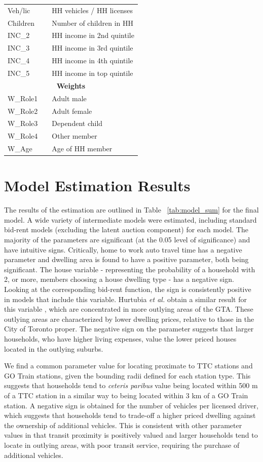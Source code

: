 \begin{longtable}{l r l}
Veh/lic & & HH vehicles / HH licenses  \\
Children & & Number of children in HH  \\
INC\_2 & & HH income in 2nd quintile \\
INC\_3 & & HH income in 3rd quintile \\
INC\_4 & & HH income in 4th quintile \\
INC\_5 & & HH income in top quintile \\
\multicolumn{3}{c}{\textbf{Weights}} \\
W\_Role1 & & Adult male \\
W\_Role2 & & Adult female \\
W\_Role3 & & Dependent child \\
W\_Role4 & & Other member \\
W\_Age & & Age of HH member \\
\bottomrule
\end{longtable}

\section{Model Estimation Results}
The results of the estimation are outlined in Table ~\ref{tab:model_sum} for the final model. A wide variety of intermediate models were estimated, including standard bid-rent models (excluding the latent auction component) for each model. The majority of the parameters are significant (at the 0.05 level of significance) and have intuitive signs. Critically, home to work auto travel time has a negative parameter and dwelling area is found to have a positive parameter, both being significant. The house variable - representing the probability of a household with 2, or more, members choosing a house dwelling type - has a negative sign. Looking at the corresponding bid-rent function, the sign is consistently positive in models that include this variable. Hurtubia \emph{et al.} obtain a similar result for this variable \cite{Hurtubia2017}, which are concentrated in more outlying areas of the GTA. These outlying areas are characterized by lower dwelling prices, relative to those in the City of Toronto proper. The negative sign on the parameter suggests that larger households, who have higher living expenses, value the lower priced houses located in the outlying suburbs.

We find a common parameter value for locating proximate to TTC stations and GO Train stations, given the bounding radii defined for each station type. This suggests that households tend to \emph{ceteris paribus} value being located within 500 m of a TTC station in a similar way to being located within 3 km of a GO Train station. A negative sign is obtained for the number of vehicles per licensed driver, which suggests that households tend to trade-off a higher priced dwelling against the ownership of additional vehicles. This is consistent with other parameter values in that transit proximity is positively valued and larger households tend to locate in outlying areas, with poor transit service, requiring the purchase of additional vehicles.

